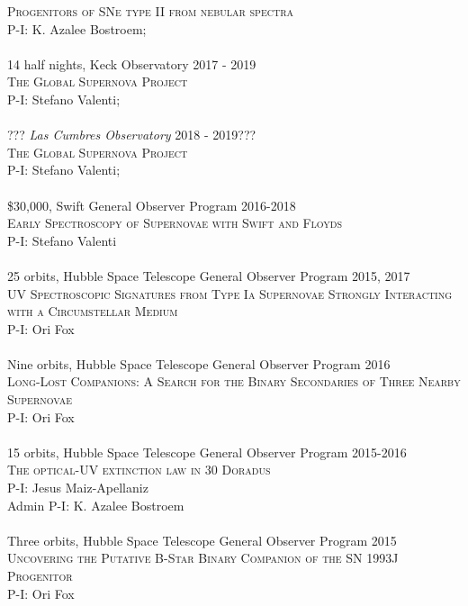 \documentclass[10pt]{cv}
\begin{document}
\begin{llist}
\textsc{Progenitors of SNe type II from nebular spectra}\\
P-I: K. Azalee Bostroem; \\
\\
14 half nights, Keck Observatory \hfill 2017 - 2019\\
\textsc{The Global Supernova Project}\\
P-I: Stefano Valenti; \\
\\
??? {\it Las Cumbres Observatory} \hfill 2018 - 2019???\\
\textsc{The Global Supernova Project}\\
P-I: Stefano Valenti; \\
\\
\$30,000, Swift General Observer Program \hfill 2016-2018 \\
\textsc{Early Spectroscopy of Supernovae with Swift and Floyds}\\
P-I: Stefano Valenti \\
\\
25 orbits, Hubble Space Telescope General Observer Program \hfill 2015, 2017\\ %
\textsc{UV Spectroscopic Signatures from Type Ia Supernovae Strongly Interacting with a Circumstellar Medium}\\
P-I: Ori Fox \\
\\
Nine orbits, Hubble Space Telescope General Observer Program \hfill 2016\\ %
\textsc{Long-Lost Companions: A Search for the Binary Secondaries of Three Nearby Supernovae}\\
P-I: Ori Fox \\
\\
15 orbits, Hubble Space Telescope General Observer Program \hfill \hfill 2015-2016\\ %
\textsc{The optical-UV extinction law in 30 Doradus}\\
P-I: Jesus Maiz-Apellaniz \\
Admin P-I: K. Azalee Bostroem \\
\\
Three orbits, Hubble Space Telescope General Observer Program \hfill 2015\\ %
\textsc{Uncovering the Putative B-Star Binary Companion of the SN 1993J Progenitor}\\
P-I: Ori Fox \\

\end{llist}
\end{document}
